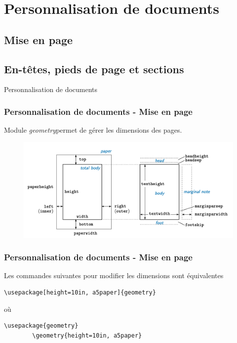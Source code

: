 
\section{Personnalisation de documents}

\subsection{Mise en page}

\subsection{En-têtes, pieds de page et sections}

\begin{frame}
    \vfill
    \begin{center}
        \large
        Personnalisation de documents
    \end{center}
    \vfill
\end{frame}

\begin{frame}
    \frametitle{Personnalisation de documents - Mise en page}
    Module \textcolor{vibrant_green}{\textit{geometry}}\footnotemark permet de gérer les dimensions des pages.
    \begin{figure}
        \centering
            \includegraphics[scale=0.35]{./figures/geometry.png}
            \label{fig: geometry}
    \end{figure}
\end{frame}

\begin{frame}[fragile]
    \frametitle{Personnalisation de documents - Mise en page}
    Les commandes suivantes pour modifier les dimensions sont équivalentes
    \vfill
    \begin{lstlisting}[xleftmargin=-10mm]
        \usepackage[height=10in, a5paper]{geometry}
    \end{lstlisting}
    \vfill
    \centering
    où
    \vfill
    \begin{lstlisting}[xleftmargin=-10mm]
        \usepackage{geometry}
        \geometry{height=10in, a5paper}
    \end{lstlisting}
\end{frame}

